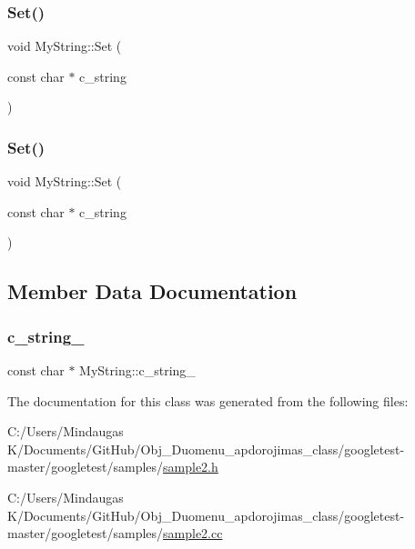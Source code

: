 \mbox{\label{class_my_string_a521c4cd7eccac6ce554d8a51505e4970}} 
\subsubsection{\texorpdfstring{Set()}{Set()}\hspace{0.1cm}{\footnotesize\ttfamily [2/3]}}
{\footnotesize\ttfamily void My\+String\+::\+Set (\begin{DoxyParamCaption}\item[{const char $\ast$}]{c\+\_\+string }\end{DoxyParamCaption})}

\mbox{\label{class_my_string_a521c4cd7eccac6ce554d8a51505e4970}} 
\subsubsection{\texorpdfstring{Set()}{Set()}\hspace{0.1cm}{\footnotesize\ttfamily [3/3]}}
{\footnotesize\ttfamily void My\+String\+::\+Set (\begin{DoxyParamCaption}\item[{const char $\ast$}]{c\+\_\+string }\end{DoxyParamCaption})}



\subsection{Member Data Documentation}
\mbox{\label{class_my_string_ab00e8ed203d462deab99236e41c2f06a}} 
\subsubsection{\texorpdfstring{c\_string\_}{c\_string\_}}
{\footnotesize\ttfamily const char $\ast$ My\+String\+::c\+\_\+string\+\_\+\hspace{0.3cm}{\ttfamily [private]}}



The documentation for this class was generated from the following files\+:\begin{DoxyCompactItemize}
\item 
C\+:/\+Users/\+Mindaugas K/\+Documents/\+Git\+Hub/\+Obj\+\_\+\+Duomenu\+\_\+apdorojimas\+\_\+class/googletest-\/master/googletest/samples/\mbox{\hyperlink{googletest-master_2googletest_2samples_2sample2_8h}{sample2.\+h}}\item 
C\+:/\+Users/\+Mindaugas K/\+Documents/\+Git\+Hub/\+Obj\+\_\+\+Duomenu\+\_\+apdorojimas\+\_\+class/googletest-\/master/googletest/samples/\mbox{\hyperlink{googletest-master_2googletest_2samples_2sample2_8cc}{sample2.\+cc}}\end{DoxyCompactItemize}
